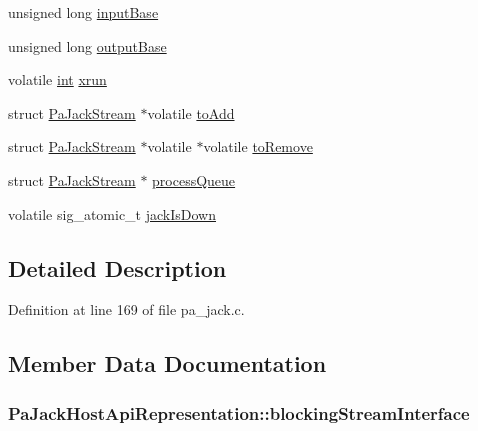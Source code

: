 \begin{DoxyCompactItemize}
unsigned long \hyperlink{struct_pa_jack_host_api_representation_a898327259b30794d861226ac6c8ec54a}{input\+Base}
\item 
unsigned long \hyperlink{struct_pa_jack_host_api_representation_aa341e520075c927035d08185496ad49a}{output\+Base}
\item 
volatile \hyperlink{xmltok_8h_a5a0d4a5641ce434f1d23533f2b2e6653}{int} \hyperlink{struct_pa_jack_host_api_representation_ace0bf7028cfbb7dc8d5965f95197b315}{xrun}
\item 
struct \hyperlink{struct_pa_jack_stream}{Pa\+Jack\+Stream} $\ast$volatile \hyperlink{struct_pa_jack_host_api_representation_a17b82d1944981cbf6734327e86e6da44}{to\+Add}
\item 
struct \hyperlink{struct_pa_jack_stream}{Pa\+Jack\+Stream} $\ast$volatile $\ast$volatile \hyperlink{struct_pa_jack_host_api_representation_a7512c18421ff64ed1e78efa05f4d9138}{to\+Remove}
\item 
struct \hyperlink{struct_pa_jack_stream}{Pa\+Jack\+Stream} $\ast$ \hyperlink{struct_pa_jack_host_api_representation_a1284c04d683a42a143e15d81485df227}{process\+Queue}
\item 
volatile sig\+\_\+atomic\+\_\+t \hyperlink{struct_pa_jack_host_api_representation_aae228468d5b858e77f0d6ff432dc35d0}{jack\+Is\+Down}
\end{DoxyCompactItemize}


\subsection{Detailed Description}


Definition at line 169 of file pa\+\_\+jack.\+c.



\subsection{Member Data Documentation}
\subsubsection[{\texorpdfstring{blocking\+Stream\+Interface}{blockingStreamInterface}}]{ Pa\+Jack\+Host\+Api\+Representation\+::blocking\+Stream\+Interface}\hypertarget{struct_pa_jack_host_api_representation_acaf1738e1054ff56d469cab3202acebf}{}\label{struct_pa_jack_host_api_representation_acaf1738e1054ff56d469cab3202acebf}


